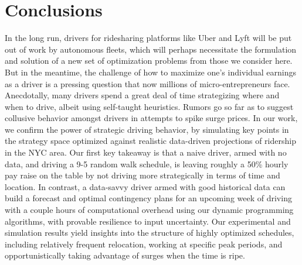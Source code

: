 
\section{Conclusions}
\label{sec:conclusions}

In the long run, drivers for ridesharing platforms like Uber and Lyft will be put 
out of work by autonomous fleets, which will perhaps necessitate the 
formulation and solution of a new set of optimization problems from those 
we consider here.  But in the meantime, the challenge of how to maximize 
one's individual earnings as a driver is a pressing question that now
millions of micro-entrepreneurs face.  Anecdotally, many drivers spend a 
great deal of time strategizing where and when to drive, albeit using 
self-taught heuristics. Rumors go so far as to suggest collusive behavior 
amongst drivers in attempts to spike surge prices.
In our work, we confirm the power of strategic driving behavior, by simulating 
key points in the strategy space optimized against realistic data-driven projections
of ridership in the NYC area.  Our first key takeaway is that a naive driver,
armed with no data, and driving a 9-5 random walk schedule, is leaving 
roughly a 50\% hourly pay raise on the table by not driving more strategically 
in terms of time and location.  In contrast, a data-savvy driver armed with
good historical data can build a forecast and optimal contingency plans for 
an upcoming week of driving with a couple hours of computational overhead using 
our dynamic programming algorithms, with provable resilience to input
uncertainty.  Our experimental and simulation results yield insights into the
structure of highly optimized schedules, including relatively frequent relocation,
working at specific peak periods, and opportunistically taking advantage of 
surges when the time is ripe.



